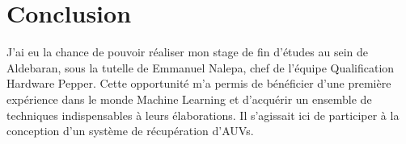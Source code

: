 \chapter{Conclusion}
\label{Conclusion}
\thispagestyle{fancy}

J'ai eu la chance de pouvoir réaliser mon stage de fin d'études au sein de Aldebaran, sous la tutelle de Emmanuel Nalepa, chef de l'équipe Qualification Hardware Pepper. Cette opportunité m’a permis de bénéficier d’une première expérience dans le monde Machine Learning et d’acquérir un ensemble de techniques indispensables à leurs élaborations. Il s’agissait ici de participer à la conception d’un système de récupération d’AUVs.